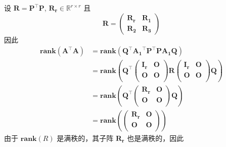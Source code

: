 \documentclass[11pt,letter,notitlepage]{article}
\newcommand{\rank}[1]{ \textbf{rank}  (#1)  }
\begin{document}
\begin{solution}
\begin{enumerate}
\begin{enumerate}
			            设 $\mathbf{R}=\mathbf{P}^{\top}\mathbf{P}$,
			            $\mathbf{R_r}\in\mathbb{R}^{r\times r}$ 且
			            $$\mathbf{R}=\begin{pmatrix}
					            \mathbf{R_r} & \mathbf{R_1} \\
					            \mathbf{R_2} & \mathbf{R_3}
				            \end{pmatrix}$$
			            因此
			            $$\begin{aligned}
					            \rank{\mathbf{A}^{\top}\mathbf{A}}
					             & = \rank{\mathbf{Q}^{\top}\mathbf{A_1}^{\top}\mathbf{P}^{\top}\mathbf{P}\mathbf{A_1}\mathbf{Q}} \\
					             & = \rank{\mathbf{Q}^{\top}
						            \begin{pmatrix}
							            \mathbf{I_r} & \mathbf{O} \\
							            \mathbf{O}   & \mathbf{O} \\
						            \end{pmatrix}
						            \mathbf{R}
						            \begin{pmatrix}
							            \mathbf{I_r} & \mathbf{O} \\
							            \mathbf{O}   & \mathbf{O} \\
						            \end{pmatrix}
						            \mathbf{Q}}                                                                                       \\
					             & = \rank{\mathbf{Q}^{\top}
						            \begin{pmatrix}
							            \mathbf{R_r} & \mathbf{O} \\
							            \mathbf{O}   & \mathbf{O} \\
						            \end{pmatrix}
						            \mathbf{Q}}                                                                                       \\
					             & = \rank{
						            \begin{pmatrix}
							            \mathbf{R_r} & \mathbf{O} \\
							            \mathbf{O}   & \mathbf{O} \\
						            \end{pmatrix}}
				            \end{aligned}$$
			            由于 $\rank{R}$ 是满秩的，其子阵 $\mathbf{R_r}$ 也是满秩的，因此

\end{enumerate}
\end{enumerate}
\end{solution}
\end{document}
